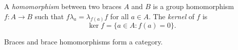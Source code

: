  \begin{definition}
 	A \emph{homomorphism} between two braces $A$ and $B$ is a group
 	homomorphism $f\colon A\to B$ such that $f\lambda_a=\lambda_{f(a)}f$ for
 	all $a\in A$.  The \emph{kernel} of $f$ is
     \[
         \ker f=\{a\in A:f(a)=0\}.
     \]
 \end{definition}

Braces and brace homomorphisms form a category.  

%
%






